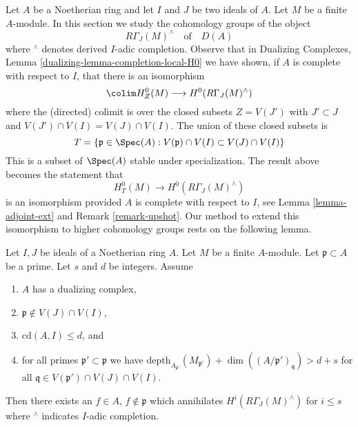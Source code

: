 \noindent
Let $A$ be a Noetherian ring and let $I$ and $J$ be two ideals of $A$.
Let $M$ be a finite $A$-module. In this section we study the
cohomology groups of the object
$$
R\Gamma_J(M)^\wedge
\quad\text{of}\quad
D(A)
$$
where ${}^\wedge$ denotes derived $I$-adic completion. Observe that in
Dualizing Complexes, Lemma \ref{dualizing-lemma-completion-local-H0}
we have shown, if $A$ is complete with respect to $I$,
that there is an isomorphism
$$
\colim H^0_Z(M) \longrightarrow H^0(R\Gamma_J(M)^\wedge)
$$
where the (directed) colimit is over the closed subsets $Z = V(J')$
with $J' \subset J$ and $V(J') \cap V(I) = V(J) \cap V(I)$.
The union of these closed subsets is
\begin{equation}
\label{equation-associated-subset}
T = \{\mathfrak p \in \Spec(A) :
V(\mathfrak p) \cap V(I) \subset V(J) \cap V(I)\}
\end{equation}
This is a subset of $\Spec(A)$ stable under specialization.
The result above becomes the statement that
$$
H^0_T(M) \longrightarrow H^0(R\Gamma_J(M)^\wedge)
$$
is an isomorphism provided $A$ is complete with respect to $I$, see
Lemma \ref{lemma-adjoint-ext} and Remark \ref{remark-upshot}.
Our method to extend this isomorphism to higher cohomology groups
rests on the following lemma.

\begin{lemma}
\label{lemma-kill-completion-general}
Let $I, J$ be ideals of a Noetherian ring $A$.
Let $M$ be a finite $A$-module. Let $\mathfrak p \subset A$ be a prime.
Let $s$ and $d$ be integers. Assume
\begin{enumerate}
\item $A$ has a dualizing complex,
\item $\mathfrak p \not \in V(J) \cap V(I)$,
\item $\text{cd}(A, I) \leq d$, and
\item for all primes $\mathfrak p' \subset \mathfrak p$
we have
$\text{depth}_{A_{\mathfrak p'}}(M_{\mathfrak p'}) +
\dim((A/\mathfrak p')_\mathfrak q) > d + s$
for all $\mathfrak q \in V(\mathfrak p') \cap V(J) \cap V(I)$.
\end{enumerate}
Then there exists an $f \in A$, $f \not \in \mathfrak p$ which annihilates
$H^i(R\Gamma_J(M)^\wedge)$ for $i \leq s$ where ${}^\wedge$
indicates $I$-adic completion.
\end{lemma}

